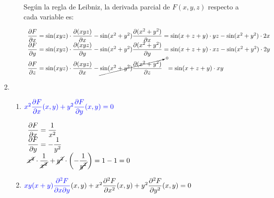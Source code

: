 \begin{enumerate}[label=\c olor{red}\textbf{\arabic*)}, leftmargin=*]
\begin{enumerate}[label=\color{red}\textbf{\alph*)}]
	Según la regla de Leibniz, la derivada parcial de $F(x,y,z)$ respecto a cada variable es:
	
	$\begin{array}{l}
		\dfrac{\partial F}{\partial x}=\sin(xyz)\cdot\dfrac{\partial (xyz)}{\partial x}-\sin(x^2+y^2)\dfrac{\partial(x^2+y^2)}{\partial x}=\sin(x+z+y)\cdot yz-\sin(x^2+y^2)\cdot 2x\\
		\dfrac{\partial F}{\partial y}=\sin(xyz)\cdot\dfrac{\partial (xyz)}{\partial y}-\sin(x^2+y^2)\dfrac{\partial(x^2+y^2)}{\partial y}=\sin(x+z+y)\cdot xz-\sin(x^2+y^2)\cdot 2y\\
		\dfrac{\partial F}{\partial z}=\sin(xyz)\cdot\dfrac{\partial (xyz)}{\partial x}-\cancelto{0}{\sin(x^2+y^2)\dfrac{\partial(x^2+y^2)}{\partial z}}~~=\sin(x+z+y)\cdot xy\\
	\end{array}$
	
\end{enumerate}
	\item {}
	\begin{enumerate}[label=\color{red}\textbf{\alph*)}]
		\item $\textcolor{blue}{x^2\dfrac{\partial F}{\partial x}(x,y)+y^2\dfrac{\partial F}{\partial y}(x,y)=0}$
		
		$\begin{array}{l}
		\dfrac{\partial F}{\partial x}=\dfrac{1}{x^2}\\
		\dfrac{\partial F}{\partial y}=-\dfrac{1}{y^2}\\
		\cancel{x^2}\cdot\dfrac{1}{\cancel{x^2}}+\cancel{y^2}\cdot\left(-\dfrac{1}{\cancel{y^2}}\right)=1-1=0
		\end{array}$
		
		\item $\textcolor{blue}{xy(x+y)\dfrac{\partial^2 F}{\partial x\partial y}}(x,y)+x^2\dfrac{\partial^2 F}{\partial x^2}(x,y)+y^2\dfrac{\partial^2 F}{\partial y^2}(x,y)=0$
		

\end{enumerate}
\end{enumerate}
